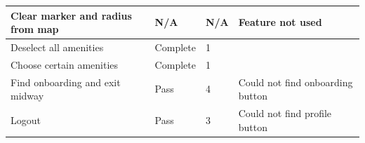 \begin{table}[h!]
\begin{tabular}{|p{}|p{}|p{}|p{}|}
        \hline
        Clear marker and radius from map & N/A             & N/A                 & Feature not used                                                                  \\
        \hline
        Deselect all amenities           & Complete        & 1                   &                                                                                   \\
        \hline
        Choose certain amenities         & Complete        & 1                   &                                                                                   \\
        \hline
        Find onboarding and exit midway  & Pass            & 4                   & Could not find onboarding button                                                  \\
        \hline
        Logout                           & Pass            & 3                   & Could not find profile button                                                     \\
        \hline
    \end{tabular}
\end{table}

